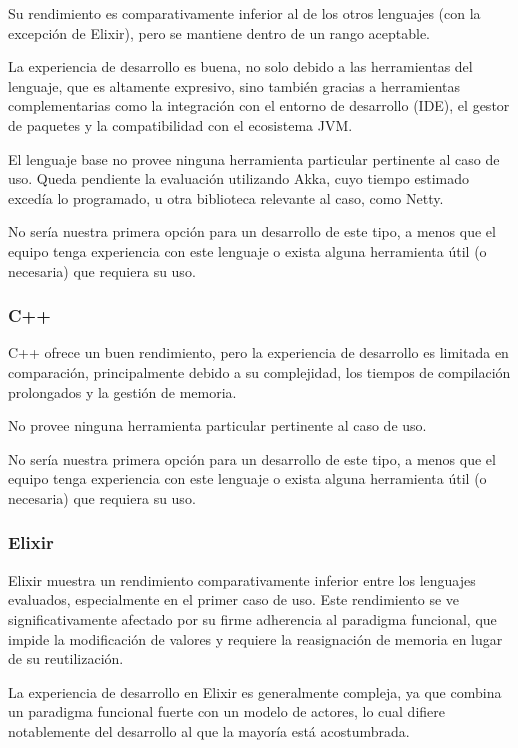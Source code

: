 \documentclass[11pt]{article}
\let\Oldsubsubsection\subsubsection
\renewcommand{\subsubsection}{\FloatBarrier\Oldsubsubsection}
\begin{document}
Su rendimiento es comparativamente inferior al de los otros lenguajes (con la excepción de Elixir), pero se mantiene dentro de un rango aceptable.

La experiencia de desarrollo es buena, no solo debido a las herramientas del lenguaje, que es altamente expresivo, sino también gracias a herramientas complementarias como la integración con el entorno de desarrollo (IDE), el gestor de paquetes y la compatibilidad con el ecosistema JVM.

El lenguaje base no provee ninguna herramienta particular pertinente al caso de uso. Queda pendiente la evaluación utilizando Akka, cuyo tiempo estimado excedía lo programado, u otra biblioteca relevante al caso, como Netty. 

No sería nuestra primera opción para un desarrollo de este tipo, a menos que el equipo tenga experiencia con este lenguaje o exista alguna herramienta útil (o necesaria) que requiera su uso.

\subsubsection{C++}

C++ ofrece un buen rendimiento, pero la experiencia de desarrollo es limitada en comparación, principalmente debido a su complejidad, los tiempos de compilación prolongados y la gestión de memoria.

No provee ninguna herramienta particular pertinente al caso de uso.

No sería nuestra primera opción para un desarrollo de este tipo, a menos que el equipo tenga experiencia con este lenguaje o exista alguna herramienta útil (o necesaria) que requiera su uso.

\subsubsection{Elixir}

Elixir muestra un rendimiento comparativamente inferior entre los lenguajes evaluados, especialmente en el primer caso de uso. Este rendimiento se ve significativamente afectado por su firme adherencia al paradigma funcional, que impide la modificación de valores y requiere la reasignación de memoria en lugar de su reutilización.

La experiencia de desarrollo en Elixir es generalmente compleja, ya que combina un paradigma funcional fuerte con un modelo de actores, lo cual difiere notablemente del desarrollo al que la mayoría está acostumbrada.
\end{document}
